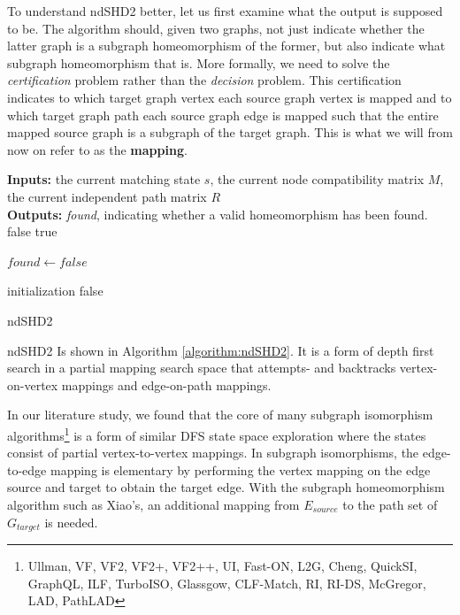 To understand ndSHD2 better, let us first examine what the output is supposed to be. The algorithm should, given two graphs, not just indicate whether the latter graph is a subgraph homeomorphism of the former, but also indicate what subgraph homeomorphism that is. More formally, we need to solve the \textit{certification} problem rather than the \textit{decision} problem. This certification indicates to which target graph vertex each source graph vertex is mapped and to which target graph path each source graph edge is mapped such that the entire mapped source graph is a subgraph of the target graph. This is what we will from now on refer to as the \textbf{mapping}.

\begin{algorithm}[H]
\SetAlgoLined
\textbf{Inputs: } the current matching state $s$, the current node compatibility matrix $M$, the current independent path matrix $R$\\
\textbf{Outputs: } \textit{found}, indicating whether a valid homeomorphism has been found.\\
 {
	\Return false\;
}  {
	\Return true\;
}

$found \longleftarrow false$

 initialization\;
 \Return false\;
 \caption{ndSHD2}
 \label{algorithm:ndSHD2}
\end{algorithm}

ndSHD2 Is shown in Algorithm \ref{algorithm:ndSHD2}. It is a form of depth first search in a partial mapping search space that attempts- and backtracks vertex-on-vertex mappings and edge-on-path mappings.

In our literature study, we found that the core of many subgraph isomorphism algorithms\footnote{Ullman, VF, VF2, VF2+, VF2++, UI, Fast-ON, L2G, Cheng, QuickSI, GraphQL, ILF, TurboISO, Glassgow, CLF-Match, RI, RI-DS, McGregor, LAD, PathLAD} is a form of similar DFS state space exploration where the states consist of partial vertex-to-vertex mappings. In subgraph isomorphisms, the edge-to-edge mapping is elementary by performing the vertex mapping on the edge source and target to obtain the target edge. With the subgraph homeomorphism algorithm such as Xiao's, an additional mapping from $E_{source}$ to the path set of $G_{target}$ is needed.


